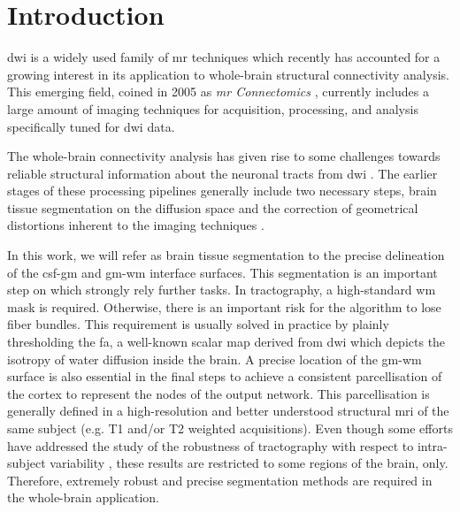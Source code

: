 \section{Introduction}
\label{sec:introduction}
%
\ac{dwi} is a widely used family of \ac{mr} techniques
\citep{sundgren_diffusion_2004} which recently has accounted for a growing
interest in its application to whole-brain structural connectivity analysis.
This emerging field, coined in 2005 as \emph{\ac{mr} Connectomics}
\citep{hagmann_diffusion_2005,sporns_human_2005}, currently includes a
large amount of imaging techniques for acquisition, processing, and analysis
specifically tuned for \ac{dwi} data.

The whole-brain connectivity analysis has given rise to some challenges
towards reliable structural information
about the neuronal tracts from \ac{dwi} \cite{johansen-berg_using_2009,
jones_white_2012}. The earlier stages of these
processing pipelines generally include two necessary steps, brain tissue
segmentation on the diffusion space and the correction of geometrical
distortions inherent to the imaging techniques \citep{hagmann_mr_2012}.

In this work, we will refer as brain tissue segmentation to the precise
delineation of the \ac{csf}-\ac{gm} and \ac{gm}-\ac{wm} interface surfaces.
This segmentation is an important step on which strongly rely further
tasks. In tractography, a high-standard \ac{wm} mask is required. Otherwise,
there is an important risk for the algorithm to lose fiber bundles. This
requirement is usually solved in practice by plainly thresholding the 
\ac{fa}, a well-known scalar map derived from \ac{dwi} which depicts 
the isotropy of water diffusion inside the brain. 
A precise location of the
\ac{gm}-\ac{wm} surface is also essential in the final steps to
achieve a consistent parcellisation of the cortex to represent the nodes 
of the output network. This parcellisation is generally defined in a 
high-resolution and better understood structural \ac{mri} of the same 
subject (e.g. T1 and/or T2 weighted acquisitions). %
Even though some efforts have addressed
the study of the robustness of tractography with respect to intra-subject variability
\cite{wakana_reproducibility_2007,heiervang_between_2006}, these results are restricted to some regions of the brain, only. Therefore, extremely robust
and precise segmentation methods are required in the whole-brain application. 

